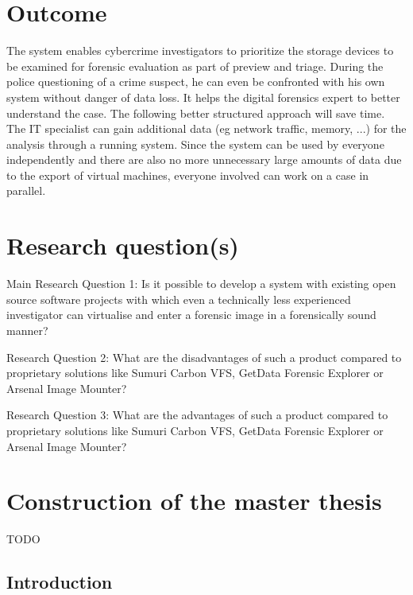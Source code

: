 \section{Outcome}


The system enables cybercrime investigators to prioritize the storage devices to be examined for forensic evaluation as part of preview and triage.
During the police questioning of a crime suspect, he can even be confronted with his own system without danger of data loss.
It helps the digital forensics expert to better understand the case. The following better structured approach will save time.
The IT specialist can gain additional data (eg network traffic, memory, ...) for the analysis through a running system.
Since the system can be used by everyone independently and there are also no more unnecessary large amounts of data due to the export of virtual machines, everyone involved can work on a case in parallel.

\section{Research question(s)}

Main Research Question 1:\newline
\noindent Is it possible to develop a system with existing open source software projects with which even a technically less experienced investigator can virtualise and enter a forensic image in a forensically sound manner?\newline

\noindent Research Question 2:\newline
\noindent What are the disadvantages of such a product compared to proprietary solutions like Sumuri Carbon VFS, GetData Forensic Explorer or Arsenal Image Mounter?\newline

\noindent Research Question 3:\newline
\noindent What are the advantages of such a product compared to proprietary solutions like Sumuri Carbon VFS, GetData Forensic Explorer or Arsenal Image Mounter?

\section{Construction of the master thesis}

TODO

\subsection{Introduction}

